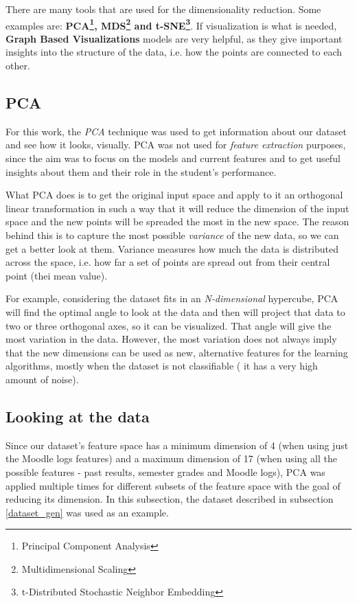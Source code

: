 There are many tools that are used for the dimensionality reduction. Some 
examples are: {\bf PCA\footnote{Principal Component Analysis}, MDS\footnote
{Multidimensional Scaling} and t-SNE\footnote{t-Distributed Stochastic Neighbor 
Embedding}}. If visualization is what is needed, {\bf Graph Based Visualizations} 
models are very helpful, as they give important insights into the structure 
of the data, i.e. how the points are connected to each other.

\subsection{PCA}

For this work, the {\it PCA} technique was used to get information about our 
dataset and see how it looks, visually. PCA was not used for {\it feature 
extraction} purposes, since the aim was to focus on the models and current 
features and to get useful insights about them and their role in the student's 
performance. 

What PCA does is to get the original input space and apply to it an orthogonal 
linear transformation in such a way that it will reduce the dimension of the 
input space and the new points will be spreaded the most in the new space. 
The reason behind this is to capture the most possible {\it variance} of the 
new data, so we can get a better look at them. Variance measures how much 
the data is distributed across the space, i.e. how far a set of points are 
spread out from their central point (thei mean value).

For example, considering the dataset fits in an {\it N-dimensional} hypercube, 
PCA will find the optimal angle to look at the data and then will project that data 
to two or three orthogonal axes, so it can be visualized. That angle will 
give the most variation in the data. However, the most variation does not 
always imply that the new dimensions can be used as new, alternative features 
for the learning algorithms, mostly when the dataset is not classifiable ( it 
has a very high amount of noise).

\subsection{Looking at the data}

Since our dataset's feature space has a minimum dimension of 4 (when 
using just the Moodle logs features) and a maximum dimension of 17 (when 
using all the possible features - past results, semester grades and 
Moodle logs), PCA was applied multiple times for different subsets of the 
feature space with the goal of reducing its dimension. In this subsection, 
the dataset described in subsection \ref{dataset_gen} was used as an example. 

